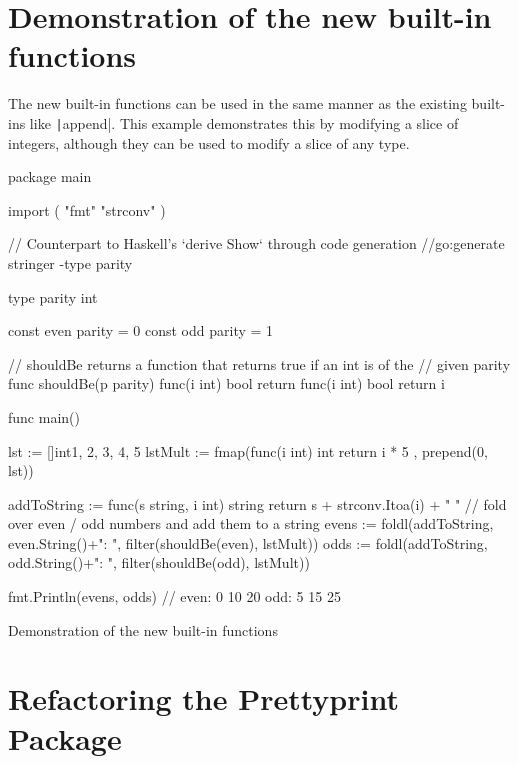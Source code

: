 
\section{Demonstration of the new built-in functions}

The new built-in functions can be used in the same manner as the existing built-ins like
\texttt|append|. This example demonstrates this by modifying a slice
of integers, although they can be used to modify a slice of any type.
\begin{code}
\begin{gocode}
package main

import (
	"fmt"
	"strconv"
)

// Counterpart to Haskell's `derive Show` through code generation
//go:generate stringer -type parity

type parity int

const even parity = 0
const odd parity = 1

// shouldBe returns a function that returns true if an int is of the
// given parity
func shouldBe(p parity) func(i int) bool {
	return func(i int) bool {
		return i%
	}
}

func main() {
	lst := []int{1, 2, 3, 4, 5}
	lstMult := fmap(func(i int) int { return i * 5 }, prepend(0, lst))

	addToString := func(s string, i int) string {
		return s + strconv.Itoa(i) + " "
	}
	// fold over even / odd numbers and add them to a string
	evens := foldl(addToString, even.String()+": ",
		filter(shouldBe(even), lstMult))
	odds := foldl(addToString, odd.String()+": ",
		filter(shouldBe(odd), lstMult))

	fmt.Println(evens, odds) // even: 0 10 20  odd: 5 15 25
}
\end{gocode}
\caption{Demonstration of the new built-in functions\label{code:funcexample}}
\end{code}

\section{Refactoring the Prettyprint Package}


